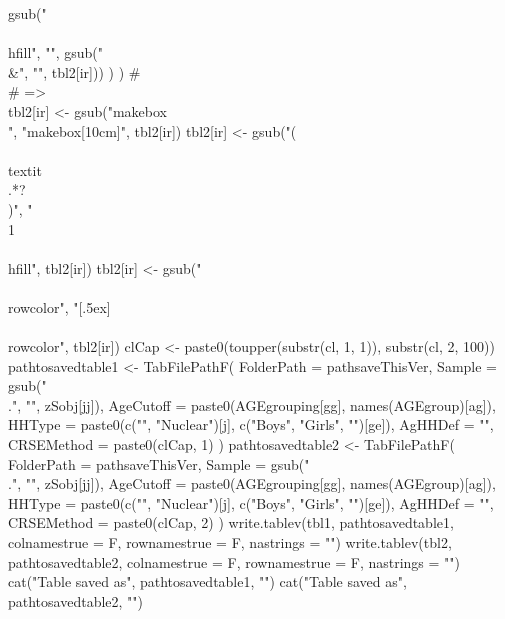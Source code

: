 \begin{Schunk}
\begin{Sinput}
{{{{{                        gsub("\\\\hfill", "}", gsub("\\&", "", tbl2[ir]))
                        )
                        )
                    #  \\\rowcolor{}
                    # => \\[.5ex]\rowcolor{}
                    tbl2[ir] <- gsub("makebox\\[.cm\\]", "makebox[10cm]", tbl2[ir])
                    tbl2[ir] <- gsub("(\\\\textit\\{.*?\\})", "\\1\\\\hfill", tbl2[ir])
                    tbl2[ir] <- gsub("\\\\rowcolor", "[.5ex]\\\\rowcolor", tbl2[ir])
                }
                clCap <- paste0(toupper(substr(cl, 1, 1)), substr(cl, 2, 100))
                pathtosavedtable1 <- TabFilePathF(
                  FolderPath = pathsaveThisVer, 
                  Sample = gsub("\\.", "", zSobj[jj]), 
                  AgeCutoff = paste0(AGEgrouping[gg], names(AGEgroup)[ag]),
                  HHType = paste0(c("", "Nuclear")[j], c("Boys", "Girls", "")[ge]),
                  AgHHDef = "",
                  CRSEMethod = paste0(clCap, 1)
                )
                pathtosavedtable2 <- TabFilePathF(
                  FolderPath = pathsaveThisVer, 
                  Sample = gsub("\\.", "", zSobj[jj]), 
                  AgeCutoff = paste0(AGEgrouping[gg], names(AGEgroup)[ag]),
                  HHType = paste0(c("", "Nuclear")[j], c("Boys", "Girls", "")[ge]),
                  AgHHDef = "",
                  CRSEMethod = paste0(clCap, 2)
                )
                write.tablev(tbl1, pathtosavedtable1, colnamestrue = F, rownamestrue = F, nastrings = "") 
                write.tablev(tbl2, pathtosavedtable2, colnamestrue = F, rownamestrue = F, nastrings = "") 
                cat("Table saved as", pathtosavedtable1, "\n")
                cat("Table saved as", pathtosavedtable2, "\n")
}}}
\end{Sinput}
\end{Schunk}
